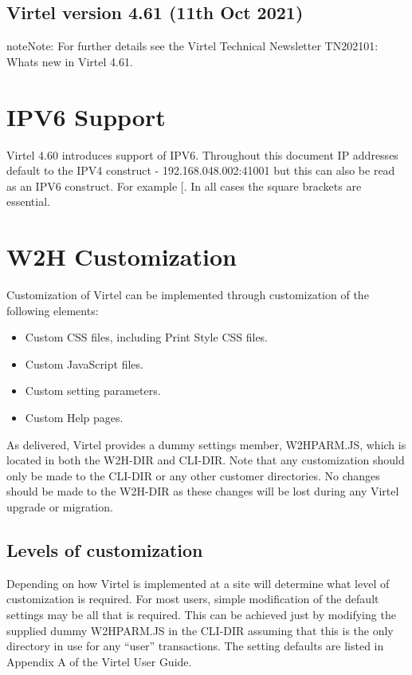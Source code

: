 \documentclass[letterpaper,10pt,english]{sphinxmanual}
\begin{document}
\section{Virtel version 4.61 (11th Oct 2021)}
\label{\detokenize{Customization:virtel-version-4-61-11th-oct-2021}}
\begin{sphinxadmonition}{note}{Note:}
For further details see the Virtel Technical Newsletter TN202101: Whats new in Virtel 4.61.
\end{sphinxadmonition}


\chapter{IPV6 Support}
\label{\detokenize{Customization:ipv6-support}}
Virtel 4.60 introduces support of IPV6. Throughout this document IP addresses default to the IPV4 construct - 192.168.048.002:41001 but this can also be read as an IPV6 construct. For example {[}. In all cases the square brackets are essential.


\chapter{W2H Customization}
\label{\detokenize{Customization:w2h-customization}}
Customization of Virtel can be implemented through customization of the following elements:
\begin{itemize}
\item {} 
Custom CSS files, including Print Style CSS files.

\item {} 
Custom JavaScript files.

\item {} 
Custom setting parameters.

\item {} 
Custom Help pages.

\end{itemize}

As delivered, Virtel provides a dummy settings member, W2HPARM.JS, which is located in both the W2H-DIR and CLI-DIR. Note that any customization should only be made to the CLI-DIR or any other customer directories. No changes should be made to the W2H-DIR as these changes will be lost during any Virtel upgrade or migration.


\section{Levels of customization}
\label{\detokenize{Customization:levels-of-customization}}
Depending on how Virtel is implemented at a site will determine what level of customization is required. For most users, simple modification of the default settings may be all that is required. This can be achieved just by modifying the supplied dummy W2HPARM.JS in the CLI-DIR assuming that this is the only directory in use for any “user” transactions. The setting defaults are listed in Appendix A of the Virtel User Guide.
\end{document}

